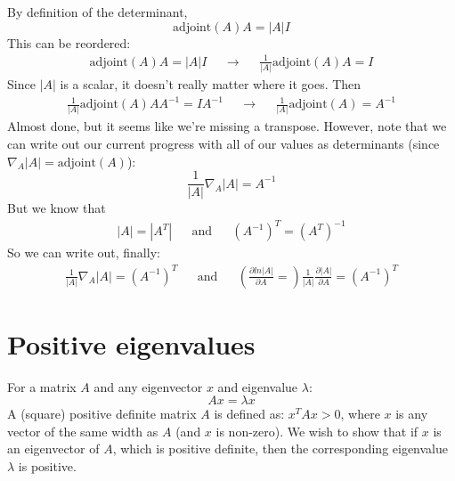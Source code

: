 \documentclass[11pt]{report}
\begin{document}
\medskip \noindent
By definition of the determinant, \[\text{adjoint}(A)A = |A|I\] %
This can be reordered:
\begin{align*}
  \text{adjoint}(A)A = |A|I
  & & \rightarrow & &
  \frac{1}{|A|}\text{adjoint}(A)A = I
\end{align*}
Since $|A|$ is a scalar, it doesn't really matter where it goes. Then
\begin{align*}
  \frac{1}{|A|}\text{adjoint}(A)AA^{-1} = IA^{-1}
  & & \rightarrow & &
  \frac{1}{|A|}\text{adjoint}(A) = A^{-1}
\end{align*}
Almost done, but it seems like we're missing a transpose. However, note that we can write out our current progress with all of our values as determinants (since $\nabla_A |A| = \text{adjoint}(A)$):
\[\frac{1}{|A|}\nabla_A |A| = A^{-1}\]
But we know that
\begin{align*}
  |A| = |A^T|
  & & \text{and} & &
  (A^{-1})^T = (A^T)^{-1}
\end{align*}
So we can write out, finally:
\begin{align*}
  \frac{1}{|A|}\nabla_A |A| = (A^{-1})^T
  & & \text{and} & &
  \left(
    \frac{ \partial ln|A| }{ \partial A } =
  \right)
  \frac{1}{|A|}\frac{\partial |A|}{\partial A} = (A^{-1})^T
\end{align*}

\section{Positive eigenvalues}

For a matrix $A$ and any eigenvector $x$ and eigenvalue $\lambda$:
\[ Ax = \lambda x \]
A (square) positive definite matrix $A$ is defined as: $x^TAx > 0$, where $x$ is any vector of the same width as $A$ (and $x$ is non-zero).
We wish to show that if $x$ is an eigenvector of $A$, which is positive definite, then the corresponding eigenvalue $\lambda$ is positive.
\end{document}
